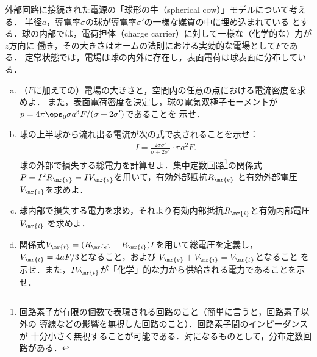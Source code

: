 \begin{bx1}
  外部回路に接続された電源の「球形の牛（spherical cow）」モデルについて考える．
  半径$a$，導電率$\sigma$の球が導電率$\sigma'$の一様な媒質の中に埋め込まれている
  とする．球の内部では，電荷担体（charge carrier）に対して一様な（化学的な）力が$z$方向に
  働き，その大きさはオームの法則における実効的な電場として$F$である．
  定常状態では，電場は球の内外に存在し，表面電荷は球表面に分布している．
  \begin{enumerate}[(a)]%
    \item
      （$F$に加えての）電場の大きさと，空間内の任意の点における電流密度を求めよ．
      また，表面電荷密度を決定し，球の電気双極子モーメントが
      $p = 4\pi \eps_0\sigma a^3 F/ (\sigma + 2\sigma')$であることを
      示せ．
    \item 
      球の上半球から流れ出る電流が次の式で表されることを示せ：
      \begin{gather}%
        I = \frac{2\sigma\sigma'}{\sigma + 2\sigma'} \cdot \pi a^2 F.
      \end{gather}%
      球の外部で損失する総電力を計算せよ．集中定数回路\footnote{
        回路素子が有限の個数で表現される回路のこと（簡単に言うと，回路素子以外の
        導線などの影響を無視した回路のこと）．回路素子間のインピーダンスが
        十分小さく無視することが可能である．対になるものとして，分布定数回路がある．
      }の関係式$P = I^2 R_{\mr{e}} = IV_{\mr{e}}$を用いて，有効外部抵抗$R_{\mr{e}}$%
      と有効外部電圧$V_{\mr{e}}$を求めよ．
    \item
      球内部で損失する電力を求め，それより有効内部抵抗$R_{\mr{i}}$と有効内部電圧$V_{\mr{i}}$
      を求めよ．
    \item
      関係式$V_{\mr{t}} = (R_{\mr{e}} + R_{\mr{i}})I$を用いて総電圧を定義し，
      $V_{\mr{t}} = 4aF / 3$となること，および
      $V_{\mr{e}}+V_{\mr{i}} = V_{\mr{t}} $となること
      を示せ．また，$IV_{\mr{t}}$が「化学」的な力から供給される電力であることを示せ．
  \end{enumerate}%
\end{bx1}

\clearpage
